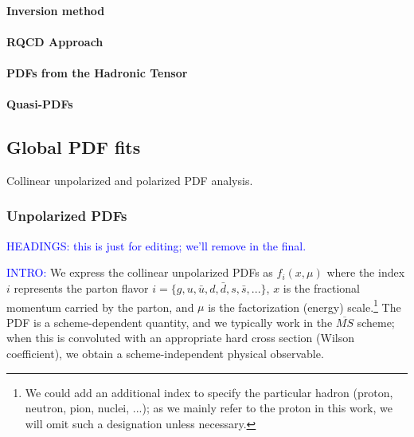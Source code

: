 \paragraph{Inversion method}


\paragraph{RQCD Approach}

\paragraph{PDFs from the Hadronic Tensor}


\paragraph{Quasi-PDFs}





\subsection{Global PDF fits}

Collinear unpolarized and polarized PDF analysis.

\subsubsection{Unpolarized PDFs}




\textcolor{blue}{HEADINGS: this is just for editing; we'll remove in the final. }

\textcolor{blue}{INTRO:} 
We express the collinear unpolarized PDFs as $f_{i}(x,\mu)$
where the index $i$ represents the parton flavor $i=\{g,u,\bar{u},d,\bar{d},s,\bar{s},...\}$,
$x$ is the fractional momentum carried by the parton, and $\mu$
is the factorization (energy) scale.\footnote{We could add an additional index to specify the particular hadron
(proton, neutron, pion, nuclei, ...); as we mainly refer to the proton
in this work, we will omit such a designation unless necessary.} The PDF is a scheme-dependent quantity, and we typically work in
the $\overline{MS}$ scheme; when this is convoluted with an appropriate
hard cross section (Wilson coefficient), we obtain a scheme-independent
physical observable. 

